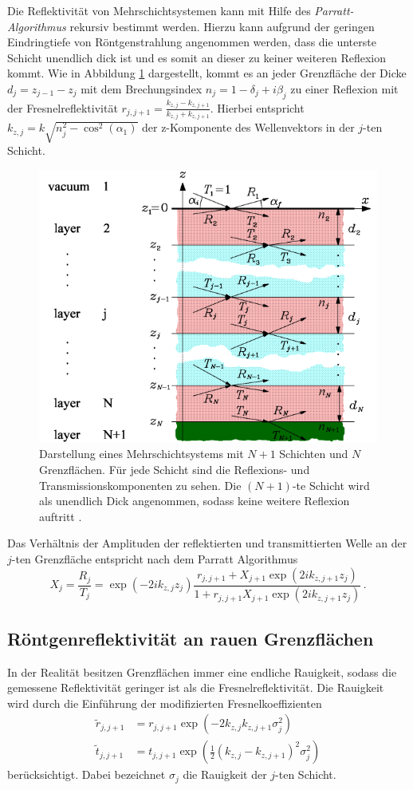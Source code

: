 Die Reflektivität von Mehrschichtsystemen kann mit Hilfe des \textit{Parratt-Algorithmus} rekursiv bestimmt werden.
Hierzu kann aufgrund der geringen Eindringtiefe von Röntgenstrahlung angenommen werden, dass die unterste Schicht unendlich dick ist und es somit an dieser zu keiner weiteren Reflexion kommt.
Wie in Abbildung \ref{fig:tfig4} dargestellt, kommt es an jeder Grenzfläche der Dicke $d_j = z_{j-1}-z_j$ mit dem Brechungsindex $n_j=1-\delta_j+i\beta_j$ zu einer Reflexion mit der Fresnelreflektivität $r_{j, j+1}=\frac{k_{z,j}-k_{z,j+1}}{k_{z,j}+k_{z,j+1}}$.
Hierbei entspricht $k_{z,j}= k\sqrt{n_j^2-\cos^2(\alpha_1)}$ der z-Komponente des Wellenvektors in der $j$-ten Schicht.
\begin{figure}[H]
\centering
\includegraphics[width=0.7\linewidth]{figures/Parratt}
\caption{Darstellung eines Mehrschichtsystems mit $N+1$ Schichten und $N$ Grenzflächen.
Für jede Schicht sind die Reflexions- und Transmissionskomponenten zu sehen.
Die $(N+1)$-te Schicht wird als unendlich Dick angenommen, sodass keine weitere Reflexion auftritt \cite{skript}.}
\label{fig:tfig4}
\end{figure}
Das Verhältnis der Amplituden der reflektierten und transmittierten Welle an der $j$-ten Grenzfläche entspricht nach dem Parratt Algorithmus
\begin{equation*}
    X_j = \frac{R_j}{T_j}=\exp(-2ik_{z,j}z_j)\frac{r_{j, j+1}+X_{j+1}\exp(2ik_{z,j+1}z_j)}{1+r_{j,j+1}X_{j+1}\exp(2ik_{z,j+1}z_j)}\, .
\end{equation*}

\subsection*{Röntgenreflektivität an rauen Grenzflächen}
In der Realität besitzen Grenzflächen immer eine endliche Rauigkeit, sodass die gemessene Reflektivität geringer ist als die Fresnelreflektivität.
Die Rauigkeit wird durch die Einführung der modifizierten Fresnelkoeffizienten
\begin{align}
    \tilde{r}_{j, j+1} &= r_{j,j+1}\exp\left(-2k_{z,j}k_{z,j+1}\sigma_j^2\right) \label{eq:rau} \\
    \tilde{t}_{j, j+1} &= t_{j,j+1}\exp\left(\frac{1}{2}(k_{z,j}-k_{z,j+1})^2\sigma_j^2\right )\nonumber
\end{align}
berücksichtigt. Dabei bezeichnet $\sigma_j$ die Rauigkeit der $j$-ten Schicht.

